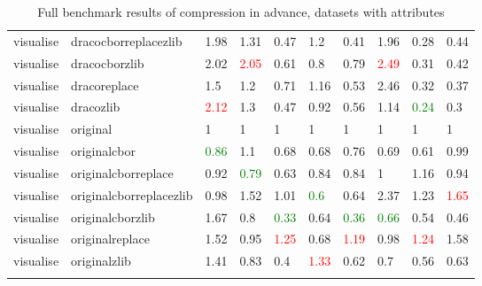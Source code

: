 \begin{landscape}
\begin{longtable}{llllllllll}
\rowcolor{lightgray}  visualise & dracocborreplacezlib & 1.98 & 1.31 & 0.47 & 1.2 & 0.41 & 1.96 & 0.28 & 0.44\\
\rowcolor{lightgray}  visualise & dracocborzlib & 2.02 & \textcolor{red}{2.05} & 0.61 & 0.8 & 0.79 & \textcolor{red}{2.49} & 0.31 & 0.42\\
visualise & dracoreplace & 1.5 & 1.2 & 0.71 & 1.16 & 0.53 & 2.46 & 0.32 & 0.37\\
visualise & dracozlib & \textcolor{red}{2.12} & 1.3 & 0.47 & 0.92 & 0.56 & 1.14 & \textcolor{green}{0.24} & 0.3\\
visualise & original & 1 & 1 & 1 & 1 & 1 & 1 & 1 & 1\\
visualise & originalcbor & \textcolor{green}{0.86} & 1.1 & 0.68 & 0.68 & 0.76 & 0.69 & 0.61 & 0.99\\
visualise & originalcborreplace & 0.92 & \textcolor{green}{0.79} & 0.63 & 0.84 & 0.84 & 1 & 1.16 & 0.94\\
visualise & originalcborreplacezlib & 0.98 & 1.52 & 1.01 & \textcolor{green}{0.6} & 0.64 & 2.37 & 1.23 & \textcolor{red}{1.65}\\
visualise & originalcborzlib & 1.67 & 0.8 & \textcolor{green}{0.33} & 0.64 & \textcolor{green}{0.36} & \textcolor{green}{0.66} & 0.54 & 0.46\\
visualise & originalreplace & 1.52 & 0.95 & \textcolor{red}{1.25} & 0.68 & \textcolor{red}{1.19} & 0.98 & \textcolor{red}{1.24} & 1.58\\
visualise & originalzlib & 1.41 & 0.83 & 0.4 & \textcolor{red}{1.33} & 0.62 & 0.7 & 0.56 & 0.63\\*
\caption{Full benchmark results of compression in advance, datasets with attributes}
\label{tab:fullresultsiaattr}
\end{longtable}




\end{landscape}






